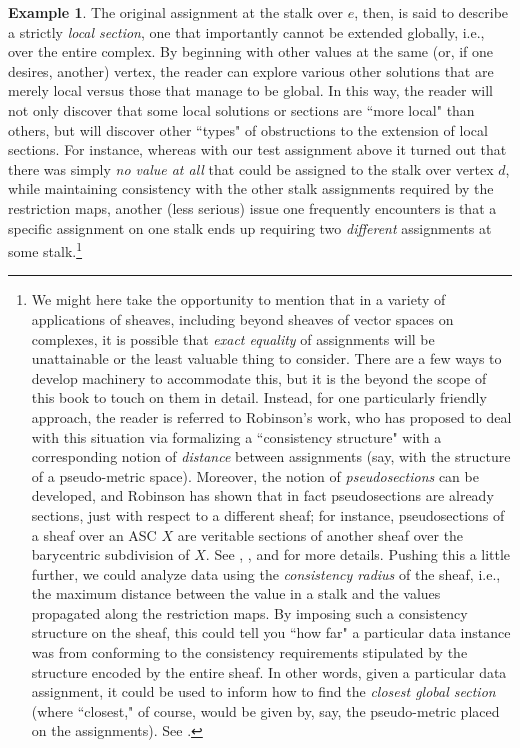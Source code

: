 \documentclass[a4paper]{book}
\theoremstyle{definition}
\newtheorem{example}{Example}[section]
\theoremstyle{definition}
\theoremstyle{definition}
\theoremstyle{theorem}
\theoremstyle{definition}
\begin{document}
\begin{example}
		The original assignment at the stalk over $e$, then, is said to describe a strictly \textit{local section}, one that importantly cannot be extended globally, i.e., over the entire complex. By beginning with other values at the same (or, if one desires, another) vertex, the reader can explore various other solutions that are merely local versus those that manage to be global. In this way, the reader will not only discover that some local solutions or sections are ``more local" than others, but will discover other ``types" of obstructions to the extension of local sections. For instance, whereas with our test assignment above it turned out that there was simply \textit{no value at all} that could be assigned to the stalk over vertex $d$, while maintaining consistency with the other stalk assignments required by the restriction maps, another (less serious) issue one frequently encounters is that a specific assignment on one stalk ends up requiring two \textit{different} assignments at some stalk.\footnote{We might here take the opportunity to mention that in a variety of applications of sheaves, including beyond sheaves of vector spaces on complexes, it is possible that \textit{exact equality} of assignments will be unattainable or the least valuable thing to consider. There are a few ways to develop machinery to accommodate this, but it is the beyond the scope of this book to touch on them in detail. Instead, for one particularly friendly approach, the reader is referred to Robinson's work, who has proposed to deal with this situation via formalizing a ``consistency structure" with a corresponding notion of \textit{distance} between assignments (say, with the structure of a pseudo-metric space). Moreover, the notion of \textit{pseudosections} can be developed, and Robinson has shown that in fact pseudosections are already sections, just with respect to a different sheaf; for instance, pseudosections of a sheaf over an ASC $X$ are veritable sections of another sheaf over the barycentric subdivision of $X$. See \cite{robinson_pseudosections_2015}, \cite{robinson_sheaves_2016}, and \cite{praggastis_maximal_2016} for more details. Pushing this a little further, we could analyze data using the \textit{consistency radius} of the sheaf, i.e., the maximum distance between the value in a stalk and the values propagated along the restriction maps. By imposing such a consistency structure on the sheaf, this could tell you ``how far" a particular data instance was from conforming to the consistency requirements stipulated by the structure encoded by the entire sheaf. In other words, given a particular data assignment, it could be used to inform how to find the \textit{closest global section} (where ``closest," of course, would be given by, say, the pseudo-metric placed on the assignments). See \cite{robinson_assignments_2018}.} \par 

\end{example}
\end{document}
